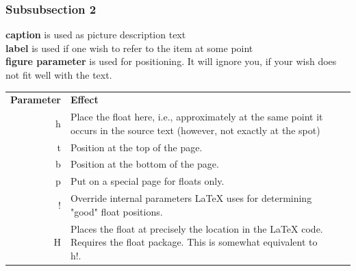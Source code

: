 \subsubsection{Subsubsection 2}
\textbf{caption} is used as picture description text\\
\textbf{label} is used if one wish to refer to the item at some point\\
\textbf{figure parameter} is used for positioning. It will ignore you, if your wish does not fit well with the text.\\
\begin{table}[h!]\centering
  \begin{tabularx}{\textwidth}{@{}rXXl@{}}\toprule
    \textbf{Parameter} & \textbf{Effect}\\
    h & Place the float here, i.e., approximately at the same point it occurs in the source text (however, not exactly at the spot)\\
    t & Position at the top of the page.\\
    b & Position at the bottom of the page.\\
    p & Put on a special page for floats only.\\
    ! & Override internal parameters LaTeX uses for determining "good" float positions.\\
    H & Places the float at precisely the location in the LaTeX code. Requires the float package. This is somewhat equivalent to h!.\\
	\bottomrule
  \end{tabularx}
\end{table}
\newpage